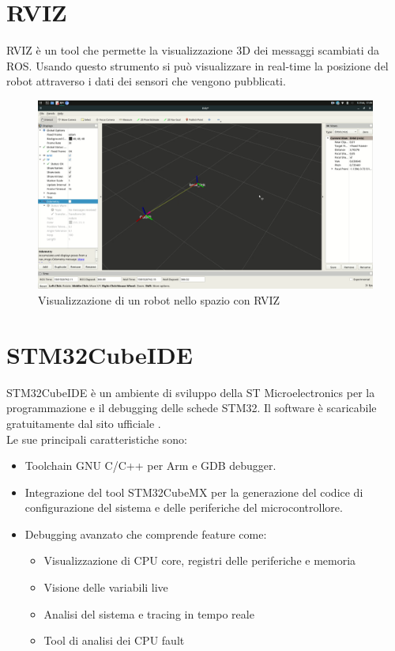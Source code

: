 \section{RVIZ}
RVIZ è un tool che permette la visualizzazione 3D dei messaggi scambiati da ROS. Usando questo strumento si può visualizzare in real-time la posizione del robot attraverso i dati dei sensori che vengono pubblicati.

\begin{figure}[H]
\centering
\includegraphics[width=\textwidth]{images/rviz.png}
\caption{Visualizzazione di un robot nello spazio con RVIZ}
\end{figure}

\section{STM32CubeIDE}
STM32CubeIDE è un ambiente di sviluppo della ST Microelectronics per la programmazione e il debugging delle schede STM32. Il software è scaricabile gratuitamente dal sito ufficiale \cite{STM32CubeIDE}. \\
Le sue principali caratteristiche sono:
\begin{itemize}
    \item Toolchain GNU C/C++ per Arm e GDB debugger.
    \item Integrazione del tool STM32CubeMX per la generazione del codice di configurazione del sistema e delle periferiche del microcontrollore.
    \item Debugging avanzato che comprende feature come:
    \begin{itemize}
        \item Visualizzazione di CPU core, registri delle periferiche e memoria
        \item Visione delle variabili live 
        \item Analisi del sistema e tracing in tempo reale
        \item Tool di analisi dei CPU fault
    \end{itemize}
\end{itemize}

